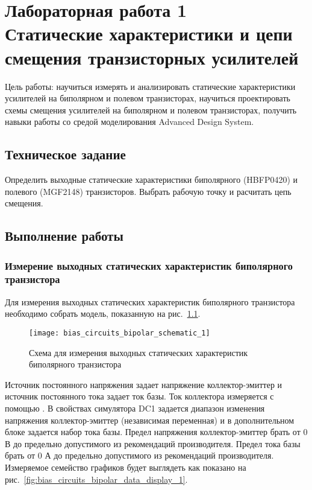 \chapter{Лабораторная работа 1 \\
Статические характеристики и цепи смещения транзисторных усилителей}

Цель работы: научиться измерять и анализировать статические характеристики усилителей на биполярном и полевом транзисторах, научиться проектировать схемы смещения усилителей на биполярном и полевом транзисторах, получить навыки работы со средой моделирования Advanced Design System.

\section{Техническое задание}

Определить выходные статические характеристики биполярного (HBFP0420) и полевого (MGF2148) транзисторов. Выбрать рабочую точку и расчитать цепь смещения.

\section{Выполнение работы}

\subsection{Измерение выходных статических характеристик биполярного транзистора}

Для измерения выходных статических характеристик биполярного транзистора необходимо собрать модель, показанную на рис.~\ref{fig:bias_circuits_bipolar_schematic_1}.

\begin{figure}[!ht]
    \centering
    \texttt{[image: bias\_circuits\_bipolar\_schematic\_1]}
    \caption{Схема для измерения выходных статических характеристик биполярного транзистора}%
    \label{fig:bias_circuits_bipolar_schematic_1}
\end{figure}

Источник постоянного напряжения  задает напряжение коллектор-эмиттер и источник постоянного тока  задает ток базы.
Ток коллектора измеряется с помощью .
В свойствах симулятора DC1 задается диапазон изменения напряжения коллектор-эмиттер (независимая переменная) и в дополнительном блоке  задается набор тока базы.
Предел напряжения коллектор-эмиттер брать от 0 В до предельно допустимого из рекомендаций производителя. Предел тока базы брать от 0 А до предельно допустимого из рекомендаций производителя.
Измеряемое семейство графиков будет выглядеть как показано на рис.~\ref{fig:bias_circuits_bipolar_data_display_1}.

